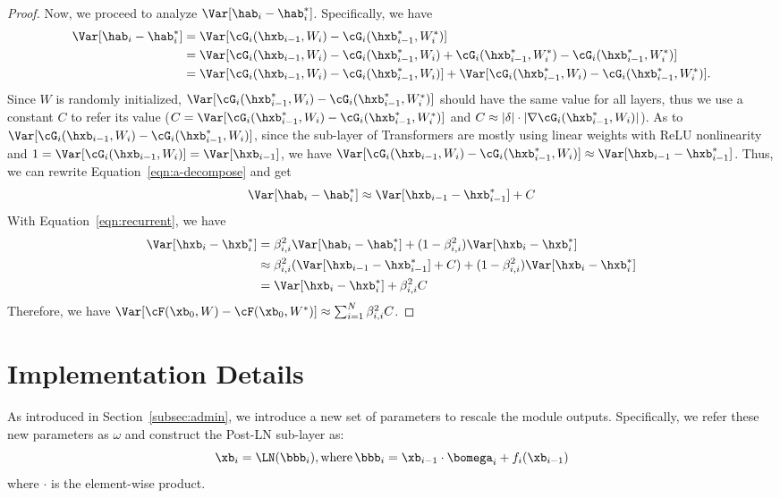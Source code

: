 \begin{proof}
Now, we proceed to analyze $\Var[\hab_i - \hab_i^*]$. Specifically, we have
\begin{align}
\Var[\hab_i - \hab_i^*] &= \Var[\cG_i(\hxb_{i-1}, W_i) - \cG_i(\hxb^*_{i-1}, W_i^*)] \nonumber \\
&= \Var[\cG_i(\hxb_{i-1}, W_i) - \cG_i(\hxb^*_{i-1}, W_i) + \cG_i(\hxb^*_{i-1}, W_i^*) - \cG_i(\hxb^*_{i-1}, W_i^*)] \nonumber \\
&= \Var[\cG_i(\hxb_{i-1}, W_i) - \cG_i(\hxb^*_{i-1}, W_i)] + \Var[\cG_i(\hxb^*_{i-1}, W_i) - \cG_i(\hxb^*_{i-1}, W_i^*)]. 
\label{eqn:a-decompose}
\end{align}
Since $W$ is randomly initialized, $\Var[\cG_i(\hxb^*_{i-1}, W_i) - \cG_i(\hxb^*_{i-1}, W_i^*)]$ should have the same value for all layers, thus we use a constant $C$ to refer its value ($C=\Var[\cG_i(\hxb^*_{i-1}, W_i) - \cG_i(\hxb^*_{i-1}, W_i^*)]$ and $C \approx |\delta| \cdot |\nabla \cG_i(\hxb^*_{i-1}, W_i)|$). 
As to $\Var[\cG_i(\hxb_{i-1}, W_i) - \cG_i(\hxb^*_{i-1}, W_i)]$, since the sub-layer of Transformers are mostly using linear weights with ReLU nonlinearity and $1 = \Var[\cG_i(\hxb_{i-1}, W_i)] = \Var[\hxb_{i-1}]$, we have $\Var[\cG_i(\hxb_{i-1}, W_i) - \cG_i(\hxb^*_{i-1}, W_i)] \approx \Var[\hxb_{i-1} - \hxb^*_{i-1}]$. 
Thus, we can rewrite Equation~\ref{eqn:a-decompose} and get  
$$
\Var[\hab_i - \hab_i^*] \approx \Var[\hxb_{i-1} - \hxb^*_{i-1}] + C
$$
With Equation~\ref{eqn:recurrent}, we have
\begin{align*}
\Var[\hxb_i - \hxb^*_i] &= \beta^2_{i, i} \Var[\hab_i - \hab_i^*] + (1 - \beta^2_{i, i}) \Var[\hxb_i - \hxb^*_i] \\
& \approx \beta^2_{i, i} (\Var[\hxb_{i-1} - \hxb^*_{i-1}] + C) + (1 - \beta^2_{i, i}) \Var[\hxb_i - \hxb^*_i] \\
& = \Var[\hxb_i - \hxb^*_i] + \beta^2_{i, i} C 
\end{align*}
Therefore, we have $\Var[\cF(\xb_0, W) - \cF(\xb_0, W^*)] \approx \sum_{i=1}^N \beta^2_{i, i} C$.
\end{proof}

\section{\our Implementation Details}
\label{appendix:implement}

As introduced in Section~\ref{subsec:admin}, we introduce a new set of parameters to rescale the module outputs. 
Specifically, we refer these new parameters as $\omega$ and construct the Post-LN sub-layer as:
$$
\xb_{i} = \LN (\bbb_i), \mbox{where}\, \bbb_i=\xb_{i-1} \cdot \bomega_i + f_i (\xb_{i-1})
$$
where $\cdot$ is the element-wise product. 

